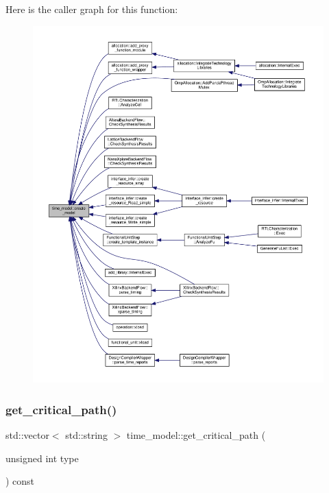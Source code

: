 Here is the caller graph for this function\+:
\nopagebreak
\begin{figure}[H]
\begin{center}
\leavevmode
\includegraphics[width=350pt]{d3/d73/classtime__model_a91cd4bf13a96b80a8168281a95a34eca_icgraph}
\end{center}
\end{figure}
\mbox{\label{classtime__model_af175296b2d08dfc84c7a16b61be1ebb3}} 
\subsubsection{\texorpdfstring{get\+\_\+critical\+\_\+path()}{get\_critical\_path()}}
{\footnotesize\ttfamily std\+::vector$<$ std\+::string $>$ time\+\_\+model\+::get\+\_\+critical\+\_\+path (\begin{DoxyParamCaption}\item[{unsigned int}]{type }\end{DoxyParamCaption}) const}



